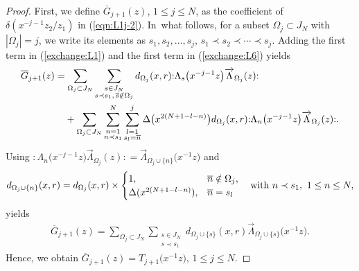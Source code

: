 \documentclass[10pt,a4paper]{amsart}
\numberwithin{equation}{section}
\begin{document}
\begin{proof}
First, we define $\overline{G}_{j+1}(z)$, $1\leq j \leq N$,
as the coefficient of
$\delta(x^{-j-1}z_2/z_1)$ in (\ref{eqn:L1j-2}).
In~what follows, for a subset $\Omega_j \subset J_N$ with $|\Omega_j|=j$,
we write its elements as $s_1, s_2, \dots, s_j$, $s_1\prec s_2 \prec \cdots \prec s_j$.
Adding the first term in (\ref{exchange:L1}) and the first term in (\ref{exchange:L6}) yields
\begin{align*}
\begin{split}
&\overline{G}_{j+1}(z)
=\sum_{\Omega_j \subset J_N}
\sum\limits_{\substack{s \in J_N\\s \prec s_1, \,\overline{s} \notin \Omega_j}}
d_{\Omega_{j}}(x,r){:}\Lambda_{s}\big(x^{-j-1}z\big)\overrightarrow{\Lambda}_{{\Omega_{j}}}(z){:}\notag
\\
&\hphantom{\overline{G}_{j+1}(z)=}
+\sum_{\Omega_j \subset J_N}\sum\limits_{\substack{n=1\\n \prec s_1}}^N
\sum\limits_{\substack{l=1\\s_l=\overline{n}}}^j\Delta\big(x^{2(N+1-l-n)}\big) d_{{\Omega_{j}}}(x,r)
{:}\Lambda_{n}\big(x^{-j-1}z\big)\overrightarrow{\Lambda}_{{\Omega_{j}}}(z){:}.
\end{split}
\end{align*}
Using
${:}\Lambda_{n}\big(x^{-j-1}z\big)\overrightarrow{\Lambda}_{{\Omega_{j}}}(z){:}
=\overrightarrow{\Lambda}_{{\Omega_{j}\cup \{n\}}}\big(x^{-1}z\big)$
and
\begin{gather*}
d_{{\Omega_{j}\cup \{n\}}}(x,r)=
d_{{\Omega_{j}}}(x,r)\times
\begin{cases}
1,& \overline{n} \notin \Omega_j,
\\
\Delta(x^{{2(N+1-l-n)}}),&\overline{n}=s_l
\end{cases}\quad
{\rm with}\ n \prec s_1,\ 1\leq n \leq N,
\end{gather*}
yields
\begin{gather*}
\overline{G}_{j+1}(z)=
\sum_{\Omega_j \subset J_N}\sum\limits_{\substack{s \in J_N
\\s\prec s_1}}d_{\Omega_j\cup \{s\}}(x,r)
\overrightarrow{\Lambda}_{\Omega_j \cup \{s\}}\big(x^{-1}z\big) .
\end{gather*}
Hence, we obtain ${\overline{G}_{j+1}(z)}=T_{j+1}\big(x^{-1}z\big)$, $1\leq j \leq N$.


\end{proof}
\end{document}
